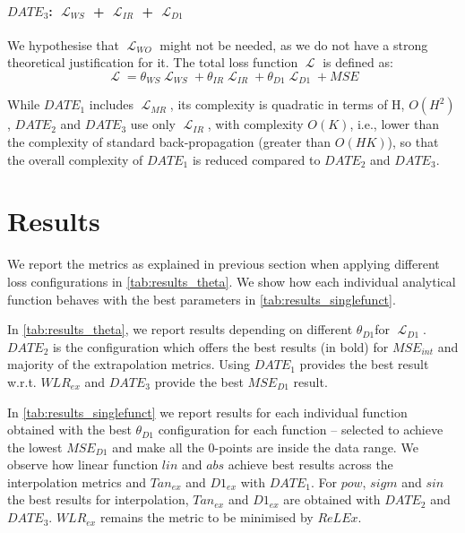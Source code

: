 \documentclass[runningheads]{llncs}
\DeclareMathOperator{\Lagr}{\mathcal{L}}
\begin{document}
\paragraph{$DATE_3$: $\Lagr_{WS}$ + $\Lagr_{IR}$ + $\Lagr_{D1}$}
We hypothesise that $\Lagr_{WO}$ might not be needed, as we do not have a strong theoretical justification for it. 
The total loss function $\Lagr$ is defined as:
\begin{equation}
 \Lagr = \theta_{WS}\Lagr_{WS} + \theta_{IR}\Lagr_{IR} + \theta_{D1}\Lagr_{D1} + MSE
\end{equation} 

While $DATE_1$ includes $\Lagr_{MR}$, its complexity is quadratic in terms of H, $O(H^2)$,
$DATE_2$ and $DATE_3$ use only $\Lagr_{IR}$, with complexity $O(K)$, i.e., lower than the complexity of standard back-propagation (greater than $O(HK)$), so that the overall complexity of $DATE_1$ is reduced compared to $DATE_2$ and $DATE_3$.


\section{Results}

We report the metrics as explained in previous section when applying different loss configurations in \autoref{tab:results_theta}.
We show how each individual analytical function behaves with the best parameters in \autoref{tab:results_singlefunct}.

In \autoref{tab:results_theta}, we report results depending on different $\theta_{D1}$for $\Lagr_{D1}$. 
$DATE_2$ is the configuration which offers the best results (in bold) for $MSE_{int}$ and majority of the extrapolation metrics.
Using $DATE_1$ provides the best result w.r.t. $WLR_{ex}$ and $DATE_3$ provide the best $MSE_{D1}$ result.

In \autoref{tab:results_singlefunct} we report results for each individual function obtained with the best $\theta_{D1}$ configuration for each function -- selected to achieve the lowest $MSE_{D1}$ and make all the $0$-points are inside the data range.
We observe how linear function $lin$ and $abs$ achieve best results across the interpolation metrics and $Tan_{ex}$ and $D1_{ex}$ with $DATE_1$.
For $pow$, $sigm$ and $sin$ the best results for interpolation, $Tan_{ex}$ and $D1_{ex}$ are obtained with $DATE_2$ and $DATE_3$.
$WLR_{ex}$ remains the metric to be minimised by $ReLEx$.
\end{document}
